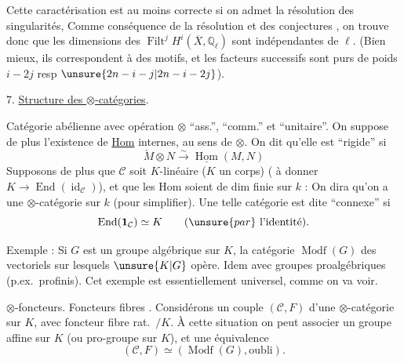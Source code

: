 Cette caractérisation  est  au moins correcte si on admet la résolution des singularités, 
Comme conséquence de la résolution et des conjectures , on trouve donc que les dimensions des $\operatorname{Filt}^jH^i(\overline X,\mathbb{Q}_\ell)$ sont indépendantes de $\ell$.
(Bien mieux, ils correspondent à des motifs, et les  facteurs successifs sont  purs de poids $i-2j$ resp $\unsure{2n-i-j|2n-i-2j}$).

7. \uline{Structure des $\otimes$-catégories}. 

 Catégorie abélienne avec opération $\otimes$ ``ass.'', ``comm.'' et ``unitaire''. On suppose de plus l'existence de \uline{Hom} internes, au sens de $\otimes$.
On dit qu'elle est ``rigide'' si
\[
\check M\otimes N\xrightarrow{\sim}\underline{\operatorname{Hom}}(M,N)
\]
Supposons de plus que $\mathcal C$ soit $K$-linéaire ($K$ un corps)
( à donner $K\longrightarrow\operatorname{End}(\operatorname{id}_{\mathcal C})$), et que les Hom soient de dim finie sur $k$ :  On dira qu'on a une $\otimes$-catégorie sur $k$ (pour simplifier).
Une telle catégorie est dite ``connexe'' si
\[
\operatorname{End}(\mathbf1_{\mathcal C})\simeq K\qquad(\unsure{par}\text{ l'identité}).
\]

Exemple : Si $G$ est un groupe algébrique sur $K$, la catégorie $\operatorname{Modf}(G)$ des vectoriels sur lesquels $\unsure{K|G}$ opère. Idem avec groupes proalgébriques (p.ex.\ profinis).
Cet exemple est essentiellement universel, comme on va voir.

$\otimes$-foncteurs. Foncteurs fibres .
Considérons un couple $(\mathcal C,F)$  d'une $\otimes$-catégorie sur $K$, avec foncteur fibre rat.\ $/K$. À cette situation on peut associer un groupe  affine sur $K$ (ou pro-groupe  sur $K$), et une équivalence
\[
(\mathcal C,F)\simeq(\operatorname{Modf}(G),\text{oubli}).
\]

